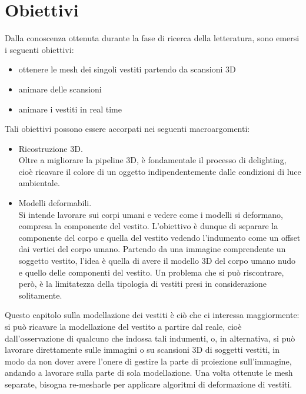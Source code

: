 \section{Obiettivi}

Dalla conoscenza ottenuta durante la fase di ricerca della letteratura, sono emersi i seguenti obiettivi:

\begin{itemize}
\item ottenere le mesh dei singoli vestiti partendo da scansioni 3D
\item animare delle scansioni
\item animare i vestiti in real time
\end{itemize}

Tali obiettivi possono essere accorpati nei seguenti macroargomenti:

\medskip

\begin{itemize}
\item Ricostruzione 3D. \\ Oltre a migliorare la pipeline 3D, è fondamentale il processo di delighting, cioè ricavare il colore di un oggetto indipendentemente dalle condizioni di luce ambientale.
\item Modelli deformabili. \\ Si intende lavorare sui corpi umani e vedere come i modelli si deformano, compresa la componente del vestito. L’obiettivo è dunque di separare la componente del corpo e quella del vestito vedendo l’indumento come un offset dai vertici del corpo umano. Partendo da una immagine comprendente un soggetto vestito, l’idea è quella di avere il modello 3D del corpo umano nudo e quello delle componenti del vestito. Un problema che si può riscontrare, però, è la limitatezza della tipologia di vestiti presi in considerazione solitamente.


\end{itemize}

\medskip

Questo capitolo sulla modellazione dei vestiti è ciò che ci interessa maggiormente: si può ricavare la modellazione del vestito a partire dal reale, cioè dall’osservazione di qualcuno che indossa tali indumenti, o, in alternativa, si può lavorare direttamente sulle immagini o su scansioni 3D di soggetti vestiti, in modo da non dover avere l’onere di gestire la parte di proiezione sull’immagine, andando a lavorare sulla parte di sola modellazione.
Una volta ottenute le mesh separate, bisogna re-mesharle per applicare algoritmi di deformazione di vestiti.

